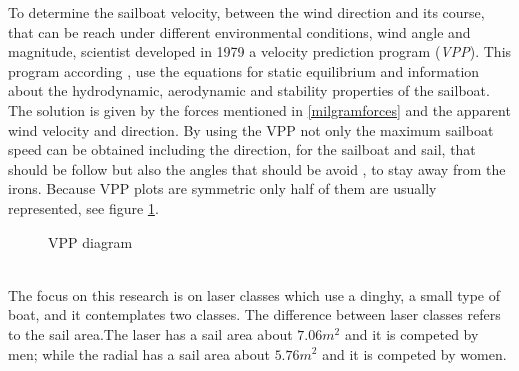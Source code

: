 To determine the sailboat velocity, between the wind direction and its course, that can be reach under different environmental conditions, wind angle and magnitude, scientist developed in 1979 a velocity prediction program (\textit{VPP}). This program according  \cite{larsonprinciples}, use the equations for static equilibrium and information about the hydrodynamic, aerodynamic and stability properties of the sailboat.  The solution is given by  the forces mentioned in \ref{milgramforces} and the apparent wind velocity and direction. By using the VPP not only the maximum sailboat speed can be obtained including the direction, for the sailboat and sail, that should be follow but also the angles that should be avoid \cite{yang2011control}, to stay away from the irons. Because VPP plots are symmetric only half of them are usually represented, see figure \ref {vpp_diag}. 

\begin{figure}[ht]
  \centering
  \hfill
  \caption{VPP diagram}
\label{vpp_diag} 
\end{figure}


\\The focus on this research is on laser classes which use a dinghy, a small type of boat, and it contemplates two classes.  %
The difference between laser classes refers to the sail area.The laser has a sail area about $7.06 m^2$  and it is competed by men; while the radial has a sail area about  $5.76 m^2$ and it is competed by women.

